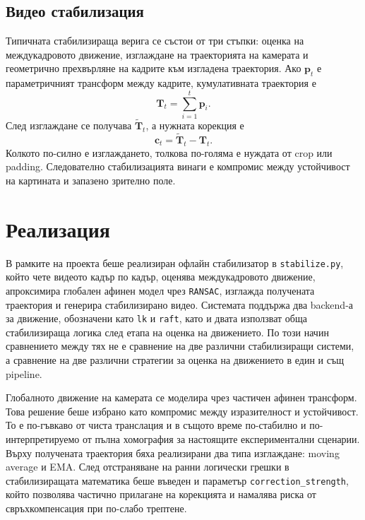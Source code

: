 \documentclass[12pt,a4paper]{article}
\begin{document}
\subsection{Видео стабилизация}
Типичната стабилизираща верига се състои от три стъпки: оценка на междукадровото движение, изглаждане на траекторията на камерата и геометрично прехвърляне на кадрите към изгладена траектория. Ако \(\mathbf{p}_t\) е параметричният трансформ между кадрите, кумулативната траектория е
\begin{equation}
\mathbf{T}_t = \sum_{i=1}^{t}\mathbf{p}_i.
\end{equation}
След изглаждане се получава \(\widetilde{\mathbf{T}}_t\), а нужната корекция е
\begin{equation}
\mathbf{c}_t = \widetilde{\mathbf{T}}_t - \mathbf{T}_t.
\end{equation}
Колкото по-силно е изглаждането, толкова по-голяма е нуждата от crop или padding. Следователно стабилизацията винаги е компромис между устойчивост на картината и запазено зрително поле.

\section{Реализация}
В рамките на проекта беше реализиран офлайн стабилизатор в \texttt{stabilize.py}, който чете видеото кадър по кадър, оценява междукадровото движение, апроксимира глобален афинен модел чрез \texttt{RANSAC}, изглажда получената траектория и генерира стабилизирано видео. Системата поддържа два backend-а за движение, обозначени като \texttt{lk} и \texttt{raft}, като и двата използват обща стабилизираща логика след етапа на оценка на движението. По този начин сравнението между тях не е сравнение на две различни стабилизиращи системи, а сравнение на две различни стратегии за оценка на движението в един и същ pipeline.

Глобалното движение на камерата се моделира чрез частичен афинен трансформ. Това решение беше избрано като компромис между изразителност и устойчивост. То е по-гъвкаво от чиста транслация и в същото време по-стабилно и по-интерпретируемо от пълна хомография за настоящите експериментални сценарии. Върху получената траектория бяха реализирани два типа изглаждане: moving average и EMA. След отстраняване на ранни логически грешки в стабилизиращата математика беше въведен и параметър \texttt{correction\_strength}, който позволява частично прилагане на корекцията и намалява риска от свръхкомпенсация при по-слабо трептене.
\end{document}
